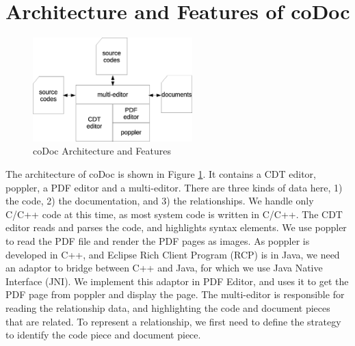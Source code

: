 \documentclass[11pt,letterpaper,oneside]{article}
\begin{document}
\section{Architecture and Features of coDoc}
\label{sec:arch}

\begin{figure}
\begin{center}
\includegraphics[width=0.55\textwidth]{architecture.eps}
\caption{coDoc Architecture and Features}
\label{fig:architecture}
\end{center}
\end{figure}

The architecture of coDoc is shown in Figure \ref{fig:architecture}. 
It contains a CDT editor, poppler, a PDF editor and a multi-editor.
There are three kinds of data here, 1) the code, 2) the documentation, and 3) the relationships.
We handle only C/C++ code at this time, 
as most system code is written in C/C++.
The CDT editor reads and parses the code, 
and highlights syntax elements.
We use poppler to read the PDF file and render the PDF pages as images.
As poppler is developed in C++, and Eclipse Rich Client Program (RCP) is in Java,
we need an adaptor to bridge between C++ and Java,
for which we use Java Native Interface (JNI).
We implement this adaptor in PDF Editor, 
and uses it to get the PDF page from poppler and display the page.
The multi-editor is responsible for reading the relationship data,
and highlighting the code and document pieces that are related.
To represent a relationship, 
we first need to define the strategy to identify the code piece and document piece.
\end{document}
